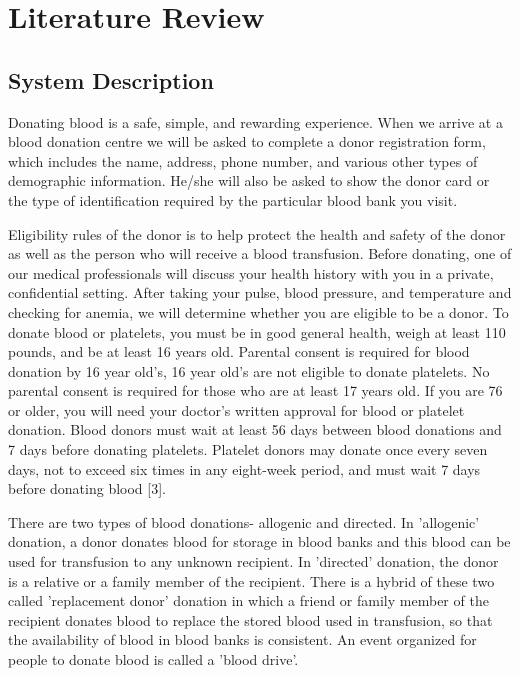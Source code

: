 \chapter{Literature Review}
 
\setcounter{equation}{0}
\section{System Description}
Donating blood is a safe, simple, and rewarding experience. When we arrive at a blood donation centre we will be asked to complete a donor registration form, which includes the name, address, phone number, and various other types of demographic information. He/she will also be asked to show the donor card or the type of identification required by the particular blood bank you visit.

\noindent Eligibility rules of the donor is to help protect the health and safety of the donor as well as the person who will receive a blood transfusion. Before donating, one of our medical professionals will discuss your health history with you in a private, confidential setting. After taking your pulse, blood pressure, and temperature and checking for anemia, we will determine whether you are eligible to be a donor. To donate blood or platelets, you must be in good general health, weigh at least 110 pounds, and be at least 16 years old. Parental consent is required for blood donation by 16 year old's, 16 year old's are not eligible to donate platelets. No parental consent is required for those who are at least 17 years old. If you are 76 or older, you will need your doctor’s written approval for blood or platelet donation. Blood donors must wait at least 56 days between blood donations and 7 days before donating platelets. Platelet donors may donate once every seven days, not to exceed six times in any eight-week period, and must wait 7 days before donating blood [3]. \par
\setlength{\parskip}{3ex}
\noindent
There are two types of blood donations- allogenic and directed. In 'allogenic' donation, a donor donates blood for storage in blood banks and this blood can be used for transfusion to any unknown recipient. In 'directed' donation, the donor is a relative or a family member of the recipient. There is a hybrid of these two called 'replacement donor' donation in which a friend or family member of the recipient donates blood to replace the stored blood used in transfusion, so that the availability of blood in blood banks is consistent. An event organized for people to donate blood is called a 'blood drive'.\par
\setlength{\parskip}{3ex}

